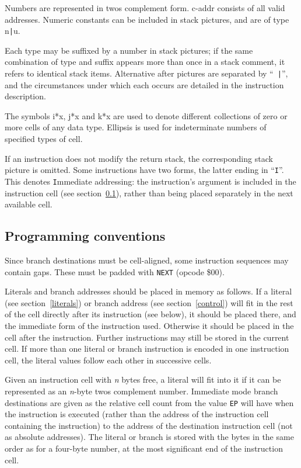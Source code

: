 \documentclass{article}
\newcommand{\spic}[1]{{\spfont\setlength{\baselineskip}{\normalbaselineskip}#1\/}}
\begin{document}
Numbers are represented in twos complement form. \spic{c-addr} consists of all
valid addresses. Numeric constants can be included in
stack pictures, and are of type \spic{n{\tt |}u}.

Each type may be suffixed by a number in stack pictures; if the same combination
of type and suffix appears more than once in a stack comment, it refers to
identical stack items. Alternative \spic{after} pictures are separated by ``{\tt
|}'', and the circumstances under which each occurs are detailed in the
instruction description.

The symbols \spic{i*x}, \spic{j*x} and \spic{k*x} are used to denote different
collections of zero or more cells of any data type. Ellipsis is used for
indeterminate numbers of specified types of cell.

If an instruction does not modify the return stack, the corresponding stack
picture is omitted. Some instructions have two forms, the latter ending in
``{\tt I}''. This denotes {\tt I}mmediate addressing: the instruction's argument
is included in the instruction cell (see section~\ref{conventions}), rather than
being placed separately in the next available cell.


\subsection{Programming conventions}
\label{conventions}

Since branch destinations must be cell-aligned, some instruction sequences may
contain gaps. These must be padded with {\tt NEXT} (opcode \$00).

Literals and branch addresses should be placed in memory as follows. If a
literal (see section~\ref{literals}) or branch address (see section~\ref{control})
will fit in the rest of the cell directly after its instruction
(see below), it should be placed there, and the immediate form of the
instruction used. Otherwise it should be placed in the cell after the
instruction. Further instructions may still be stored in the current cell. If
more than one literal or branch instruction is encoded in one instruction cell,
the literal values follow each other in successive cells.

Given an instruction cell with \textit{n} bytes free, a literal will fit into
it if it can be represented as an \textit{n}-byte twos complement number.
Immediate mode branch destinations are given as the relative cell count from
the value {\tt EP} will have when the instruction is executed (rather than the
address of the instruction cell containing the instruction) to the address of
the destination instruction cell (not as absolute addresses). The literal or
branch is stored with the bytes in the same order as for a four-byte number, at
the most significant end of the instruction cell.
\end{document}
